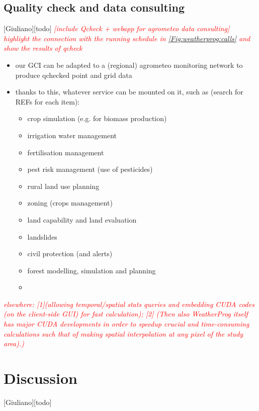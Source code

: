 \documentclass[authoryear,preprint,review,12pt]{elsarticle}
\newcommand{\note}[1]{\emph{\textcolor{red}{#1}}}
\begin{document}
\subsection{Quality check and data consulting}[Giuliano][todo]
\note{[include Qcheck + webapp for agrometeo data consulting]}\\
\note{highlight the connection with the running schedule in \cref{Fig:weatherprog:calls} and show the results of qcheck }\\

\begin{itemize}
    \item our GCI can be adapted to a (regional) agrometeo monitoring network to produce qchecked point and grid data
    \item thanks to this, whatever service can be mounted on it, such as (search for REFs for each item):
    \begin{itemize}
        \item crop simulation (e.g. for biomass production)
        \item irrigation water management
        \item fertilisation management
        \item pest risk management (use of pesticides)
        \item rural land use planning
        \item zoning (crops management)
        \item land capability and land evaluation
        \item landslides
        \item civil protection (and alerts)
        \item forest modelling, simulation and planning
        \item 
    \end{itemize}
\end{itemize}

\note{ elsewhere: [1](allowing temporal/spatial stats queries and embedding CUDA codes (on the client-side GUI) for fast calculation); [2] (Then also WeatherProg itself has major CUDA developments in order to speedup crucial and time-consuming calculations such that of making spatial interpolation at any pixel of the study area).) }

\section{Discussion}[Giuliano][todo]
\end{document}
